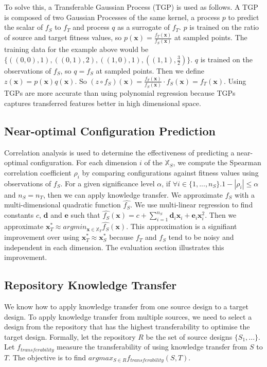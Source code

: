 \documentclass[10pt,a4paper]{article}
\begin{document}
To solve this, a Transferable Gaussian Process (TGP) is used as follows. A TGP is composed of two Gaussian Processes of the same kernel, a process $p$ to predict the scalar of $f_S$ to $f_T$ and process $q$ as a surrogate of $f_T$. $p$ is trained on the ratio of source and target fitness values, so $p(\mathbf{x})=\frac{f_T(\mathbf{x})}{f_S(\mathbf{x})}$ at sampled points. The training data for the example above would be $\{((0,0),1),((0,1),2),((1,0),1),((1,1),\frac{3}{2})\}$. $q$ is trained on the observations of $f_S$, so $q=f_S$ at sampled points. Then we define $z(\mathbf{x})=p(\mathbf{x})q(\mathbf{x})$. So $(z\circ f_S)(\mathbf{x})=\frac{f_T(\mathbf{x})}{f_S(\mathbf{x})}\cdot f_S(\mathbf{x})=f_T(\mathbf{x})$. Using TGPs are more accurate than using polynomial regression because TGPs captures transferred features better in high dimensional space.

\subsection{Near-optimal Configuration Prediction}
Correlation analysis is used to determine the effectiveness of predicting a near-optimal configuration. For each dimension $i$ of the $\mathbb{X}_S$, we compute the Spearman correlation coefficient $\rho_i$ by comparing configurations against fitness values using observations of $f_S$. For a given significance level $\alpha$, if $\forall i\in\{1,...,n_S\}.1-|\rho_i|\le\alpha$ and $n_S=n_T$, then we can apply knowledge transfer. We approximate $f_S$ with a multi-dimensional quadratic function $\hat{f_S}$\cite{Xi2004}. We use multi-linear regression to find constants $c$, $\mathbf{d}$ and $\mathbf{e}$ such that $\hat{f_S}(\mathbf{x})=c+\sum_{i=1}^{n_S}\mathbf{d}_i \mathbf{x}_i+\mathbf{e}_i \mathbf{x}_i^2$. Then we approximate $\mathbf{x}_T^*\approx argmin_{\mathbf{x}\in\mathbb{X}_T}\hat{f_S}(\mathbf{x})$. This approximation is a signifiant improvement over using $\mathbf{x}_T^*\approx\mathbf{x}_S^*$ because $f_T$ and $f_S$ tend to be noisy and independent in each dimension. The evaluation section illustrates this improvement.

\subsection{Repository Knowledge Transfer}

We know how to apply knowledge transfer from one source design to a target design. To apply knowledge transfer from multiple sources, we need to select a design from the repository that has the highest transferability to optimise the target design. Formally, let the repository $R$ be the set of source designs $\{S_1,...\}$. Let $f_{transferability}$ measure the transferability of using knowledge transfer from $S$ to $T$. The objective is to find $argmax_{S\in R}f_{transferability}(S,T)$.
\end{document}
